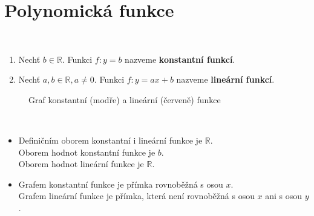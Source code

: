 \section{Polynomická funkce}

\begin{definition}\,
\begin{enumerate}[$i.$]
  \item Nechť $b \in \mathbb R$. Funkci $f:y = b$ nazveme \textbf{konstantní funkcí}.
  \item Nechť $a, b \in \mathbb R, a \neq 0$. Funkci $f:y= ax + b$ nazveme \textbf{lineární funkcí}.
\end{enumerate}
\end{definition}

\begin{figure}[ht!]
\begin{center}
  \caption{Graf konstantní (modře) a lineární (červeně) funkce}
\end{center}
\end{figure}

\begin{pozn}\,
  \begin{itemize}
    \item Definičním oborem konstantní i lineární funkce je $\mathbb R$. \\
          Oborem hodnot konstantní funkce je ${b}$.\\
          Oborem hodnot lineární funkce je $\mathbb R$.
    \item Grafem konstantní funkce je přímka rovnoběžná s osou $x$. \\
          Grafem lineární funkce je přímka, která není rovnoběžná s osou $x$ ani s osou $y$.
  \end{itemize}
\end{pozn}

